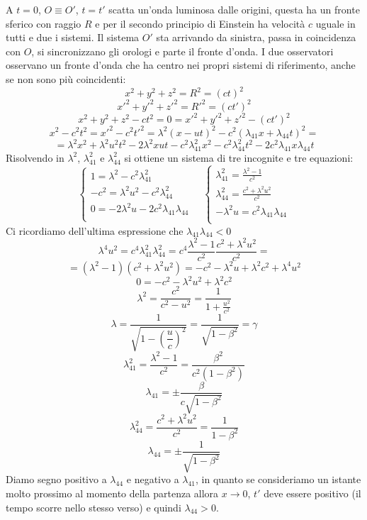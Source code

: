 A $t=0$, $O\equiv O'$, $t=t'$ scatta un'onda luminosa dalle origini, questa ha un fronte sferico con raggio $R$ e per il secondo principio di Einstein ha velocità $c$ uguale in tutti e due i sistemi. Il sistema $O'$ sta arrivando da sinistra, passa in coincidenza con $O$, si sincronizzano gli orologi e parte il fronte d'onda. I due osservatori osservano un fronte d'onda che ha centro nei propri sistemi di riferimento, anche se non sono più coincidenti:
\[x^2+y^2+z^2=R^2=(ct)^2\]
\[x'^2+y'^2+z'^2=R'^2=(ct')^2\]
\[x^2+y^2+z^2-ct^2=0=x'^2+y'^2+z'^2-(ct')^2\]
\[x^2-c^2t^2=x'^2-c^2t'^2=\lambda^2(x-ut)^2-c^2(\lambda_{41}x+\lambda_{44}t)^2=\]
\[=\lambda^2x^2+\lambda^2 u^2t^2-2\lambda^2 xut-c^2\lambda_{41}^2x^2-c^2\lambda_{44}^2t^2-2c^2\lambda_{41} x\lambda_{44} t\]
Risolvendo in $\lambda^2$, $\lambda_{41}^2$ e $\lambda_{44}^2$ si ottiene un sistema di tre incognite e tre equazioni:
\[\left\{
   \begin{array}{l}
      1=\lambda^2-c^2\lambda_{41}^2               \\
      -c^2=\lambda^2u^2-c^2\lambda_{44}^2         \\
      0=-2\lambda^2u-2c^2\lambda_{41}\lambda_{44} \\
   \end{array}
   \right.\quad \left\{
   \begin{array}{l}
      \lambda_{41}^2=\frac{\lambda^2-1}{c^2}      \\
      \lambda_{44}^2=\frac{c^2+\lambda^2u^2}{c^2} \\
      -\lambda^2u=c^2\lambda_{41}\lambda_{44}     \\
   \end{array}\right.\]
Ci ricordiamo dell'ultima espressione che $\lambda_{41}\lambda_{44}<0$
\[\lambda^4u^2=c^4\lambda_{41}^2\lambda_{44}^2=c^4\frac{\lambda^2-1}{c^2}\frac{c^2+\lambda^2u^2}{c^2}=\]
\[=(\lambda^2-1)(c^2+\lambda^2u^2)=-c^2-\lambda^2u+\lambda^2c^2+\lambda^4u^2\]
\[0=-c^2-\lambda^2u^2+\lambda^2c^2\]
\[\lambda^2=\frac{c^2}{c^2-u^2}=\frac{1}{1+\frac{u^2}{c^2}}\]
\[\lambda=\dfrac{1}{\sqrt{1-\left(\dfrac{u}{c}\right)^2}}=\dfrac{1}{\sqrt{1-\beta^2}}=\gamma\]
\[\lambda_{41}^2=\frac{\lambda^2-1}{c^2}=\frac{\beta^2}{c^2(1-\beta^2)}\]
\[\lambda_{41}=\pm\frac{\beta}{c\sqrt{1-\beta^2}}\]
\[\lambda_{44}^2=\frac{c^2+\lambda^2u^2}{c^2}=\frac{1}{1-\beta^2}\]
\[\lambda_{44}=\pm\frac{1}{\sqrt{1-\beta^2}}\]
Diamo segno positivo a $\lambda_{44}$ e negativo a $\lambda_{41}$, in quanto se consideriamo un istante molto prossimo al momento della partenza allora $x\rightarrow 0$, $t'$ deve essere positivo (il tempo scorre nello stesso verso) e quindi $\lambda_{44}>0$.

